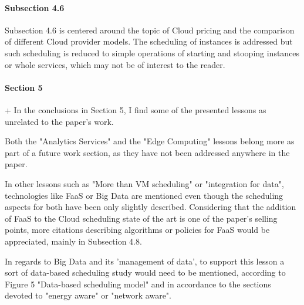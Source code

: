 

\paragraph{Subsection 4.6}

Subsection 4.6 is centered around the topic of Cloud pricing and the
comparison of different Cloud provider models. The scheduling of
instances is addressed but such scheduling is reduced to simple
operations of starting and stooping instances or whole services, which
may not be of interest to the reader.


\paragraph{Section 5}

+ In the conclusions in Section 5, I find some of the presented
lessons as unrelated to the paper's work. 

Both the "Analytics
Services" and the "Edge Computing" lessons belong more as part of a
future work section, as they have not been addressed anywhere in the
paper. 



In other lessons such as "More than VM scheduling" or
"integration for data", technologies like FaaS or Big Data are
mentioned even though the scheduling aspects for both have been only
slightly described. Considering that the addition of FaaS to the Cloud
scheduling state of the art is one of the paper's selling points, more
citations describing algorithms or policies for FaaS would be
appreciated, mainly in Subsection 4.8. 


In regards to Big Data and its
'management of data', to support this lesson a sort of data-based
scheduling study would need to be mentioned, according to Figure 5
"Data-based scheduling model" and in accordance to the sections
devoted to "energy aware" or "network aware".




